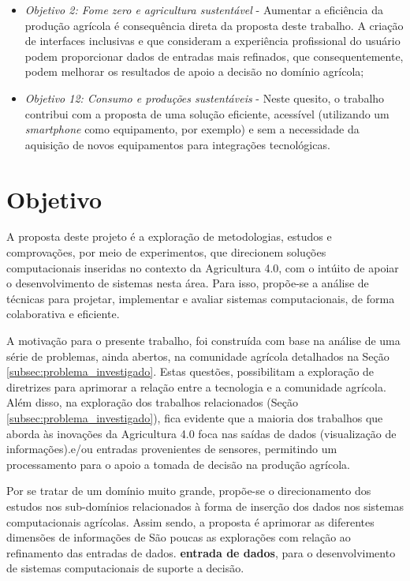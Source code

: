 \documentclass[12pt]{article}
\begin{document}
\begin{itemize}
	\item \textit{Objetivo 2: Fome zero e agricultura sustentável} - Aumentar a eficiência da produção agrícola é consequência direta da proposta deste trabalho. A criação de interfaces inclusivas e que consideram a experiência profissional do usuário podem proporcionar dados de entradas mais refinados, que consequentemente, podem melhorar os resultados de apoio a decisão no domínio agrícola;
	\item \textit{Objetivo 12: Consumo e produções sustentáveis} - Neste quesito, o trabalho contribui com a proposta de uma solução eficiente, acessível (utilizando um \textit{smartphone} como equipamento, por exemplo) e sem a necessidade da aquisição de novos equipamentos para integrações tecnológicas.
\end{itemize}

\section{Objetivo}
\label{sec:objetivo}

A proposta deste projeto é a exploração de metodologias, estudos e comprovações, por meio de experimentos, que direcionem soluções computacionais inseridas no contexto da Agricultura 4.0, com o intúito de apoiar o desenvolvimento de sistemas nesta área. Para isso, propõe-se a análise de técnicas para projetar, implementar e avaliar sistemas computacionais, de forma colaborativa e eficiente.

A motivação para o presente trabalho, foi construída com base na análise de uma série de problemas, ainda abertos, na comunidade agrícola detalhados na Seção \ref{subsec:problema_investigado}. Estas questões, possibilitam a exploração de diretrizes para aprimorar a relação entre a tecnologia e a comunidade agrícola. Além disso, na exploração dos trabalhos relacionados (Seção \ref{subsec:problema_investigado}), fica evidente que a maioria dos trabalhos que aborda às inovações da Agricultura 4.0 foca nas saídas de dados (visualização de informações).e/ou entradas provenientes de sensores, permitindo um processamento para o apoio a tomada de decisão na produção agrícola.

Por se tratar de um domínio muito grande, propõe-se o direcionamento dos estudos nos sub-domínios relacionados à forma de inserção dos dados nos sistemas computacionais agrícolas. Assim sendo, a proposta é aprimorar as diferentes dimensões de informações de  São poucas as explorações com relação ao refinamento das entradas de dados. \textbf{entrada de dados}, para o desenvolvimento de sistemas computacionais de suporte a decisão. 
\end{document}
